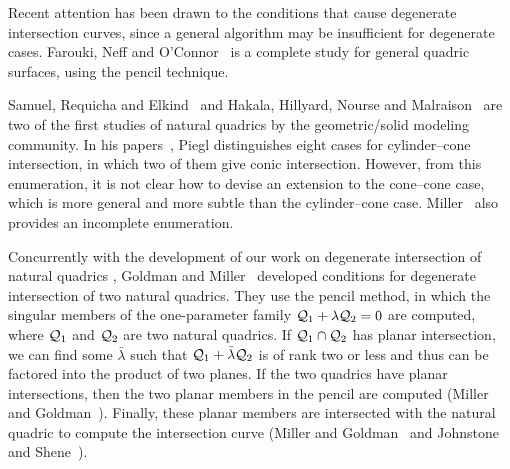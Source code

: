 Recent attention has been drawn to the conditions that cause
degenerate intersection curves,
since a general algorithm may be insufficient for degenerate cases.
Farouki, Neff and O'Connor~\cite{farouki:1989}
is a complete study for general quadric surfaces,
using the pencil technique.

Samuel, Requicha and Elkind~\cite{samuel:1976} and
Hakala, Hillyard, Nourse and Malraison~\cite{hakala:1980} are two of the first
studies of natural quadrics by the geometric/solid modeling community.
In his papers~\cite{piegl:1989,piegl:1992}, Piegl distinguishes eight
cases for cylinder--cone intersection, in which two of them give conic
intersection.  However, from this enumeration, it is not  clear how to devise
an extension to the cone--cone case, which is more general and more
subtle than the cylinder--cone case.
Miller~\cite{miller:1987} also provides an incomplete enumeration.

Concurrently with the development of our work on degenerate intersection
of natural quadrics \cite{shene-johnstone:1991a},
Goldman and Miller~\cite{g-m:1990,g-m:1991a,m-g:1991,m-g:1991a}
developed conditions for degenerate intersection of two natural quadrics.
They use the pencil method, in which the singular
members of the one-parameter family ${\cal Q}_1+\lambda{\cal Q}_2=0$ are
computed, where ${\cal Q}_1$ and ${\cal Q}_2$ are two natural quadrics.
If ${\cal Q}_1\cap{\cal Q}_2$ has planar intersection,
we can find some $\bar{\lambda}$ such that
${\cal Q}_1+\bar{\lambda}{\cal Q}_2$ is of rank two or less and thus can be
factored into the product of two planes.
If the two quadrics have planar
intersections, then the two planar
members in the pencil are computed
(Miller and Goldman~\cite{m-g:1991}).
Finally, these planar members are intersected with the natural quadric to
compute the intersection curve
(Miller and Goldman~\cite{m-g:1991a} and
Johnstone and Shene~\cite{johnstone-shene:1991}).

